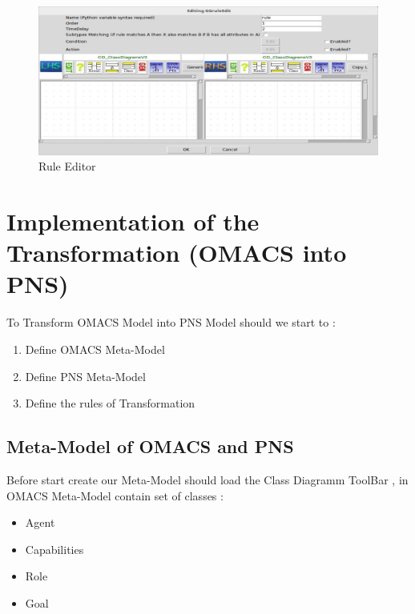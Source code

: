 \begin{figure}[th]
	\centering
 	\includegraphics{Chapiter3/img/rule}
	\caption{\label{fig:Rule Editor}Rule Editor}
\end{figure} 
 


 

\section{Implementation of the Transformation (OMACS into PNS)\label{sec:OMACS into PNS} }%
To Transform OMACS Model into PNS Model should we start to :
\begin{enumerate}
\item Define OMACS Meta-Model 
\item Define PNS Meta-Model
\item Define the rules of Transformation
\end{enumerate}


\subsection{ Meta-Model of OMACS  and PNS } 
Before start create our Meta-Model should load the Class Diagramm ToolBar ,
in OMACS Meta-Model contain set of classes :

\begin{itemize}

\item Agent  
\item Capabilities
\item Role
\item Goal

\end{itemize}
 
